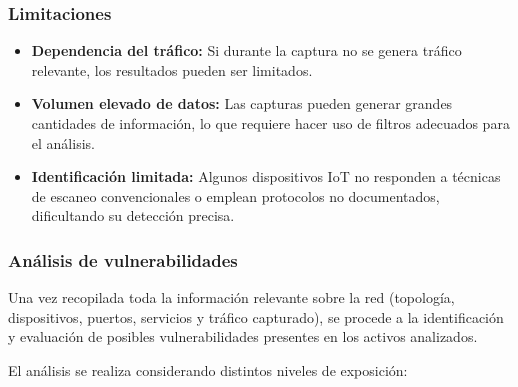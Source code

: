 \documentclass[a4paper, 11pt]{article}
\begin{document}
\subsubsection*{Limitaciones}

\begin{itemize}
    \item \textbf{Dependencia del tráfico:} Si durante la captura no se genera tráfico relevante, los resultados pueden ser limitados.
        
    \item \textbf{Volumen elevado de datos:} Las capturas pueden generar grandes cantidades de información, lo que requiere hacer uso de filtros adecuados para el análisis.

    \item \textbf{Identificación limitada:} Algunos dispositivos IoT no responden a técnicas de escaneo convencionales o emplean protocolos no documentados, dificultando su detección precisa.

\end{itemize}


\subsubsection{Análisis de vulnerabilidades}
\label{sec:analisis_vulns_seccion}
Una vez recopilada toda la información relevante sobre la red (topología, dispositivos, puertos, servicios y tráfico capturado), se procede a la identificación y evaluación de posibles vulnerabilidades presentes en los activos analizados.


El análisis se realiza considerando distintos niveles de exposición:
\end{document}
